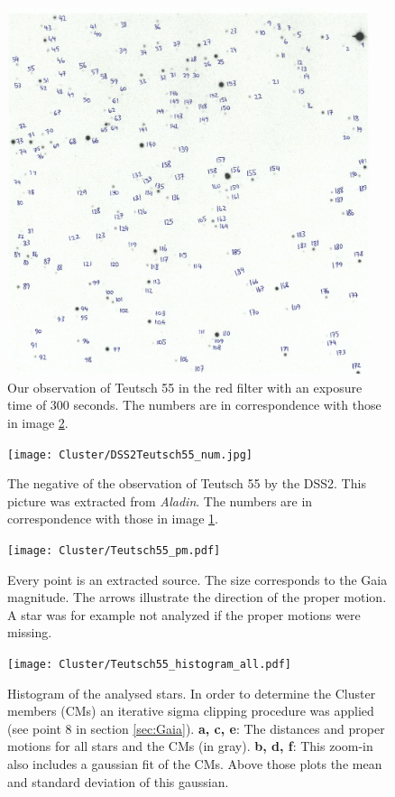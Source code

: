 \documentclass{article}
\begin{document}
\begin{figure}[H]
  \centering
    \includegraphics[width=0.95\textwidth]{Cluster/obsTeutsch55_num.jpg}
  \caption{Our observation of Teutsch 55 in the red filter with an exposure time of 300 seconds. The numbers are in correspondence with those in image \ref{fig:DSS2Teutsch55_num}.}
  \label{fig:obsTeutsch55_num}
\end{figure}

\begin{figure}[H]
  \centering
    \texttt{[image: Cluster/DSS2Teutsch55\_num.jpg]}
  \caption{The negative of the observation of Teutsch 55 by the DSS2. This picture was extracted from \textit{Aladin}. The numbers are in correspondence with those in image \ref{fig:obsTeutsch55_num}.}
  \label{fig:DSS2Teutsch55_num}
\end{figure}

\begin{figure}[H]
  \centering
    \texttt{[image: Cluster/Teutsch55\_pm.pdf]}
  \caption{Every point is an extracted source. The size corresponds to the Gaia magnitude. The arrows illustrate the direction of the proper motion. A star was for example not analyzed if the proper motions were missing.}
  \label{fig:Teutsch55_pm}
\end{figure}


\begin{figure}[H]
  \centering
    \texttt{[image: Cluster/Teutsch55\_histogram\_all.pdf]}
  \caption{Histogram of the analysed stars. In order to determine the Cluster members (CMs) an iterative sigma clipping procedure was applied (see point 8 in section \ref{sec:Gaia}). \textbf{a, c, e}: The distances and proper motions for all stars and the CMs (in gray). \textbf{b, d, f}: This zoom-in also includes a gaussian fit of the CMs. Above those plots the mean and standard deviation of this gaussian.}
  \label{fig:Teutsch55_histogram_all}
\end{figure}
\end{document}
